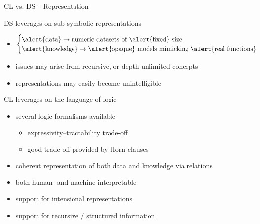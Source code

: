 \documentclass[presentation]{beamer}\mode<presentation>{\usetheme{AMSBolognaFC}}
\begin{document}
\begin{frame}[allowframebreaks]{CL vs. DS -- Representation}
    \begin{block}{DS leverages on sub-symbolic representations}
        \begin{itemize}
            \item $\begin{cases}
                \alert{\text{data}} \rightarrow \text{numeric datasets of \alert{fixed} size}
                \\
                \alert{\text{knowledge}} \rightarrow \text{\alert{opaque} models mimicking \alert{real functions}}
            \end{cases}$
            \item issues may arise from \alert{recursive}, or \alert{depth-unlimited} concepts
            \item representations may easily become \alert{unintelligible} 
        \end{itemize}
    \end{block}

    \begin{block}{CL leverages on the language of logic}
        \begin{itemize}
            \item several \alert{logic formalisms} available
            \begin{itemize}
                \item \alert{expressivity--tractability} trade-off
                \item good trade-off provided by \alert{Horn clauses}
            \end{itemize}
            \item coherent representation of both data and knowledge via relations
            \item both human- and machine-interpretable
            \item support for intensional representations
            \item support for recursive / structured information
            \end{itemize}
    \end{block}
\end{frame}
\end{document}
